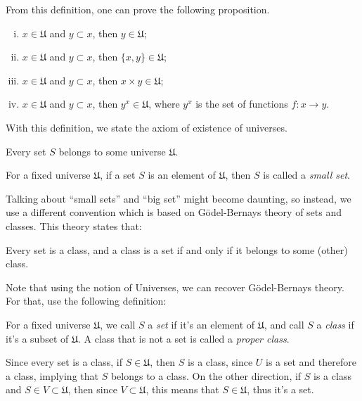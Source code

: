 From this definition, one can prove the following proposition.
\begin{proposition}
	\begin{enumerate}[(i)]
		\item $x \in \mathfrak U$ and $y \subset x$, then $y \in \mathfrak U$;
		\item $x \in \mathfrak U$ and $y \subset x$, then $\{x,y\} \in \mathfrak U$;
		\item $x \in \mathfrak U$ and $y \subset x$, then $x\times y \in \mathfrak U$;
		\item $x \in \mathfrak U$ and $y \subset x$, then $y^x \in \mathfrak U$, where $y^x$ is the set of functions $f:x \to y$.
	\end{enumerate}
	\label{prop:universe}
\end{proposition}

With this definition, we state the axiom of existence of universes.
\begin{axiom}
	Every set $S$ belongs to some universe $\mathfrak U$.
\end{axiom}

\begin{definition}
	For a fixed universe $\mathfrak U$, if a set $S$ is an element of $\mathfrak U$,
	then $S$ is called a \textit{small set}.
\end{definition}

Talking about ``small sets'' and ``big set'' might become daunting, so instead, we
use a different convention which is based on Gödel-Bernays theory of sets and classes.
This theory states that:
\begin{axiom}
	Every set is a class, and a class is a set if and only if it belongs to some (other)
	class.
	\label{axiom:gb}
\end{axiom}

Note that using the notion of Universes, we can recover Gödel-Bernays theory. For that,
use the following definition:
\begin{definition}
	For a fixed universe $\mathfrak U$, we call $S$ a \textit{set} if it's an element
	of $\mathfrak U$, and call $S$ a \textit{class} if it's a subset of $\mathfrak U$.
	A class that is not a set is called a \textit{proper class}.
\end{definition}
Since every set is a class, if $S \in \mathfrak U$, then $S$ is a class,
since $U$ is a set and therefore a class, implying that $S$ belongs to a class.
On the other direction, if $S$ is a class and $S \in V \subset \mathfrak U$,
then since $V \subset \mathfrak U$, this means that $S \in \mathfrak U$, thus
it's a set.

